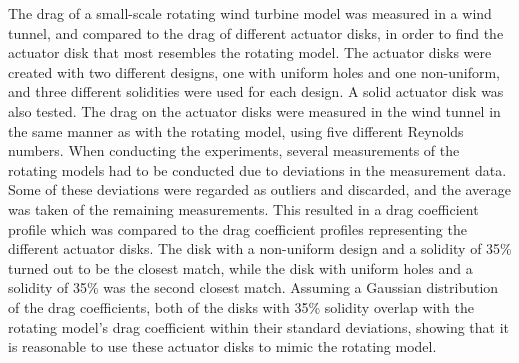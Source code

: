 The drag of a small-scale rotating wind turbine model was measured in a wind tunnel, and compared to the drag of different actuator disks, in order to find the actuator disk that most resembles the rotating model. The actuator disks were created with two different designs, one with uniform holes and one non-uniform, and three different solidities were used for each design. A solid actuator disk was also tested. The drag on the actuator disks were measured in the wind tunnel in the same manner as with the rotating model, using five different Reynolds numbers. When conducting the experiments, several measurements of the rotating models had to be conducted due to deviations in the measurement data. Some of these deviations were regarded as outliers and discarded, and the average was taken of the remaining measurements. This resulted in a drag coefficient profile which was compared to the drag coefficient profiles representing the different actuator disks. The disk with a non-uniform design and a solidity of 35\% turned out to be the closest match, while the disk with uniform holes and a solidity of 35\% was the second closest match. Assuming a Gaussian distribution of the drag coefficients, both of the disks with 35\% solidity overlap with the rotating model's drag coefficient within their standard deviations, showing that it is reasonable to use these actuator disks to mimic the rotating model. 
















